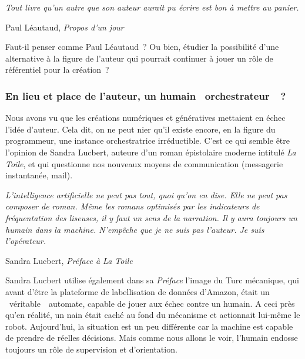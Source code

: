 \documentclass{article}
\newenvironment{citationbox}
{\begin{center}
		\begin{minipage}{.8\textwidth}
		}
		{
		\end{minipage}	
\end{center}
}
\begin{document}
					\begin{citationbox}
						\textit{Tout livre qu'un autre que son auteur aurait pu écrire est bon à mettre au panier.}
						\begin{flushright}
							Paul Léautaud, \textit{Propos d'un jour}
						\end{flushright}
					\end{citationbox}
					Faut-il penser comme Paul Léautaud~? Ou bien, étudier la possibilité d'une alternative à la figure de l'auteur qui pourrait continuer à jouer un rôle de référentiel pour la création~?
			

			\subsubsection{En lieu et place de l'auteur, un humain \guillemotleft~orchestrateur~\guillemotright~?}
				Nous avons vu que les créations numériques et génératives mettaient en échec l'idée d'auteur. Cela dit, on ne peut nier qu'il existe encore, en la figure du programmeur, une instance orchestratrice irréductible. C'est ce qui semble être l'opinion de Sandra Lucbert, auteure d'un roman épistolaire moderne intitulé \textit{La Toile}, et qui questionne nos nouveaux moyens de communication (messagerie instantanée, mail).
				\begin{citationbox}
					\textit{L’intelligence	artificielle	ne	peut	pas	tout,	quoi	qu’on	en	dise.
						Elle	 ne	 peut	 pas	 composer	 de	 roman.	 Même	 les	 romans	 optimisés	 par	 les
						indicateurs	 de	 fréquentation	 des	 liseuses,	 il	 y	 faut	 un	 sens	 de	 la	 narration.	 Il	 y
						aura	toujours	un	humain	dans	la	machine.	N’empêche	que	je	ne	suis	pas	l’auteur.
						Je	 suis	 l’opérateur.}	
					\begin{flushright}
						Sandra Lucbert, \textit{Préface à La Toile}\autocite[p.~4]{lucbert2017}
					\end{flushright}
				\end{citationbox}
				Sandra Lucbert utilise également dans sa \textit{Préface} l'image du Turc mécanique, qui avant d'être la plateforme de labellisation de données d'Amazon, était un \guillemotleft~véritable~\guillemotright~automate, capable de jouer aux échec contre un humain. A ceci près qu'en réalité, un nain était caché au fond du mécanisme et actionnait lui-même le robot. Aujourd'hui, la situation est un peu différente car la machine est capable de prendre de réelles décisions. Mais comme nous allons le voir, l'humain endosse toujours un rôle de supervision et d'orientation.\\
				
\end{document}
